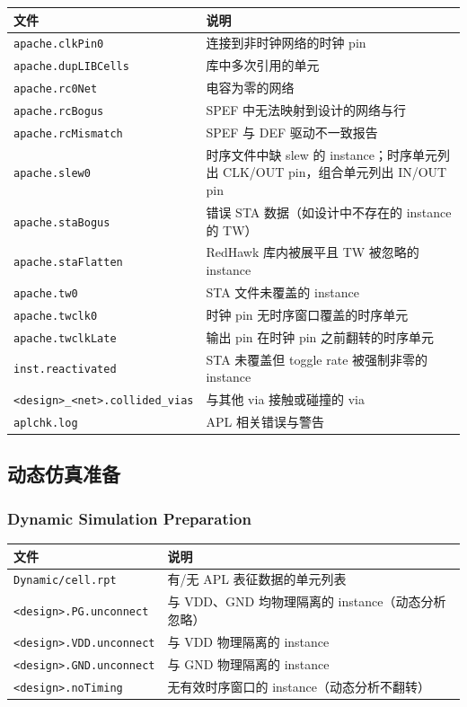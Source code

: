 \begin{table}[htbp]
\centering
\small
\begin{tabular}{@{}p{4.5cm}p{8cm}@{}}
\toprule
文件 & 说明 \\
\midrule
\texttt{apache.clkPin0} & 连接到非时钟网络的时钟 pin \\
\texttt{apache.dupLIBCells} & 库中多次引用的单元 \\
\texttt{apache.rc0Net} & 电容为零的网络 \\
\texttt{apache.rcBogus} & SPEF 中无法映射到设计的网络与行 \\
\texttt{apache.rcMismatch} & SPEF 与 DEF 驱动不一致报告 \\
\texttt{apache.slew0} & 时序文件中缺 slew 的 instance；时序单元列出 CLK/OUT pin，组合单元列出 IN/OUT pin \\
\texttt{apache.staBogus} & 错误 STA 数据（如设计中不存在的 instance 的 TW） \\
\texttt{apache.staFlatten} & RedHawk 库内被展平且 TW 被忽略的 instance \\
\texttt{apache.tw0} & STA 文件未覆盖的 instance \\
\texttt{apache.twclk0} & 时钟 pin 无时序窗口覆盖的时序单元 \\
\texttt{apache.twclkLate} & 输出 pin 在时钟 pin 之前翻转的时序单元 \\
\texttt{inst.reactivated} & STA 未覆盖但 toggle rate 被强制非零的 instance \\
\texttt{<design>\_<net>.collided\_vias} & 与其他 via 接触或碰撞的 via \\
\texttt{aplchk.log} & APL 相关错误与警告 \\
\bottomrule
\end{tabular}
\end{table}

\subsection{动态仿真准备}
\subsubsection*{Dynamic Simulation Preparation}

\begin{table}[htbp]
\centering
\small
\begin{tabular}{@{}p{4.5cm}p{8cm}@{}}
\toprule
文件 & 说明 \\
\midrule
\texttt{Dynamic/cell.rpt} & 有/无 APL 表征数据的单元列表 \\
\texttt{<design>.PG.unconnect} & 与 VDD、GND 均物理隔离的 instance（动态分析忽略） \\
\texttt{<design>.VDD.unconnect} & 与 VDD 物理隔离的 instance \\
\texttt{<design>.GND.unconnect} & 与 GND 物理隔离的 instance \\
\texttt{<design>.noTiming} & 无有效时序窗口的 instance（动态分析不翻转） \\
\bottomrule
\end{tabular}
\end{table}

